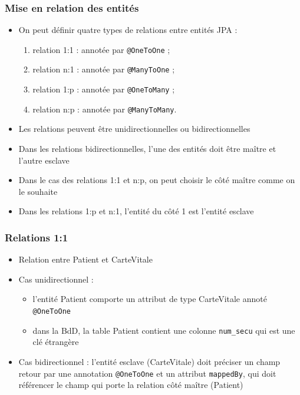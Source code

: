 \documentclass[aspectratio=169,10pt]{beamer}
\begin{document}
\begin{frame}
	\frametitle{Mise en relation des entités}
	
	\begin{itemize}
		\item On peut définir quatre types de relations entre entités JPA :
		\begin{enumerate}
			\item relation 1:1 : annotée par \texttt{@OneToOne} ;
			\item relation n:1 : annotée par \texttt{@ManyToOne} ;
			\item relation 1:p : annotée par \texttt{@OneToMany} ;
			\item relation n:p : annotée par \texttt{@ManyToMany}.
		\end{enumerate}
		
		\item Les relations peuvent être unidirectionnelles ou bidirectionnelles
		\item Dans les relations bidirectionnelles, l'une des entités doit être maître et l'autre esclave
		
		\item Dans le cas des relations 1:1 et n:p, on peut choisir le côté maître comme on le souhaite
		
		\item Dans les relations 1:p et n:1, l'entité du côté 1 est l'entité esclave
		
	\end{itemize}
	
\end{frame}

\begin{frame}
	\frametitle{Relations 1:1}
	
	\begin{itemize}
		\item Relation entre Patient et CarteVitale
		\item Cas unidirectionnel : 
		\begin{itemize}
			\item l'entité Patient comporte un attribut de type CarteVitale annoté \texttt{@OneToOne}
			\item dans la BdD, la table Patient contient une colonne \texttt{num\_secu} qui est une clé étrangère
		\end{itemize}
		
		\item Cas bidirectionnel : l'entité esclave (CarteVitale) doit préciser un champ retour par une annotation \texttt{@OneToOne} et un attribut \texttt{mappedBy}, qui doit référencer le champ qui porte la relation côté maître (Patient)
		
	\end{itemize}
	
\end{frame}
\end{document}
